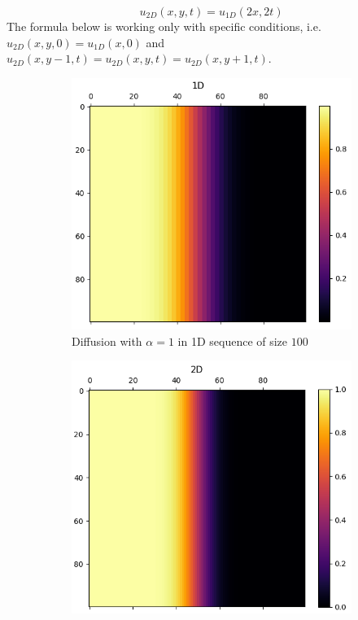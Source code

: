 \begin{equation}
    u_{2D}(x,y,t)=u_{1D}(2x,2t) 
    \label{eq:2D_1D_basic}
\end{equation}
%
The formula below is working only with specific conditions, i.e. $u_{2D}(x,y,0)=u_{1D}(x,0)$
and $u_{2D}(x,y-1,t)=u_{2D}(x,y,t)=u_{2D}(x,y+1,t)$.

\begin{figure}[ht]
    \centering
    \begin{subfigure}[b]{0.49\textwidth}
        \centering
        \includegraphics[width=\textwidth]{figures/1d_100t_1a.png}
        \caption{Diffusion with $\alpha = 1$ in 1D sequence of size $100$}
        \label{fig:diff_1d_100}
    \end{subfigure}
    \hfill
    \begin{subfigure}[b]{0.49\textwidth}
        \centering
        \includegraphics[width=\textwidth]{figures/2d_100t_1a.png}

\end{subfigure}
\end{figure}
